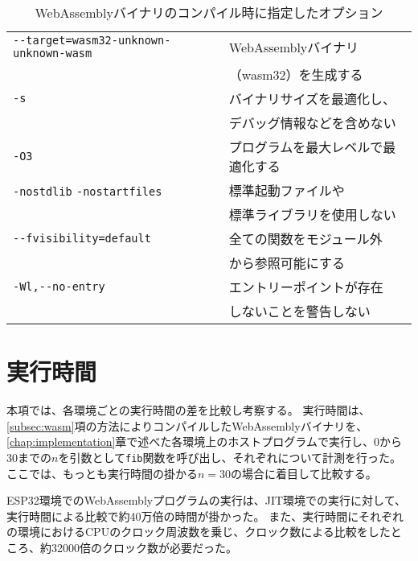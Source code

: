 \begin{table}[htbp]
  \label{tab:compiler}
  \caption{WebAssemblyバイナリのコンパイル時に指定したオプション}
  \begin{center}
    \begin{tabular}{ll}
    \hline
    \verb|--target=wasm32-unknown-unknown-wasm| & WebAssemblyバイナリ \\
    & （wasm32）を生成する \\ \hline
    \verb|-s| & バイナリサイズを最適化し、 \\
    & デバッグ情報などを含めない \\ \hline
    \verb|-O3| & プログラムを最大レベルで最適化する \\ \hline
    \verb|-nostdlib| \verb|-nostartfiles| & 標準起動ファイルや\\
    & 標準ライブラリを使用しない \\ \hline
    \verb|--fvisibility=default| & 全ての関数をモジュール外 \\
    & から参照可能にする \\ \hline
    \verb|-Wl,--no-entry| & エントリーポイントが存在 \\
    & しないことを警告しない \\ \hline
    \end{tabular}
  \end{center}
\end{table}

\section{実行時間}

本項では、各環境ごとの実行時間の差を比較し考察する。
実行時間は、\ref{subsec:wasm}項の方法によりコンパイルしたWebAssemblyバイナリを、\ref{chap:implementation}章で述べた各環境上のホストプログラムで実行し、0から30までの$n$を引数として\verb|fib|関数を呼び出し、それぞれについて計測を行った。
ここでは、もっとも実行時間の掛かる$n=30$の場合に着目して比較する。

ESP32環境でのWebAssemblyプログラムの実行は、JIT環境での実行に対して、実行時間による比較で約40万倍の時間が掛かった。
また、実行時間にそれぞれの環境におけるCPUのクロック周波数を乗じ、クロック数による比較をしたところ、約32000倍のクロック数が必要だった。


